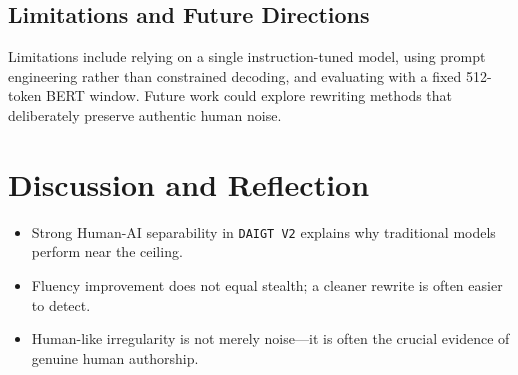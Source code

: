 \documentclass[10pt,journal,onecolumn,draftclsnofoot]{IEEEtran}
\begin{document}
\subsection{Limitations and Future Directions}
Limitations include relying on a single instruction-tuned model, using prompt engineering rather than constrained decoding, and evaluating with a fixed 512-token BERT window. Future work could explore rewriting methods that deliberately preserve authentic human noise.

\section{Discussion and Reflection}
\begin{itemize}
\item Strong Human-AI separability in \texttt{DAIGT V2} explains why traditional models perform near the ceiling.
\item Fluency improvement does not equal stealth; a cleaner rewrite is often easier to detect.
\item Human-like irregularity is not merely noise---it is often the crucial evidence of genuine human authorship.
\end{itemize}
\end{document}
